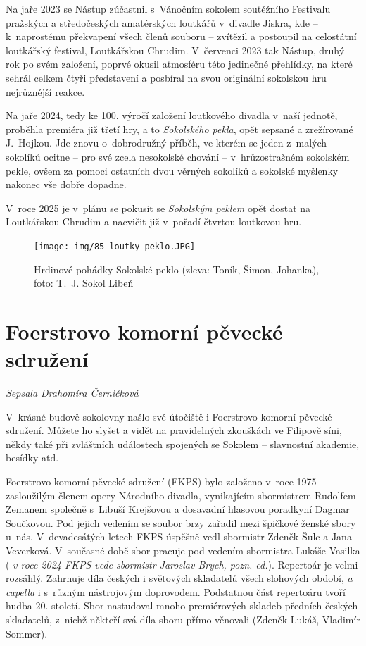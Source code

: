\documentclass[a5paper, 11pt, twoside]{article}
\newcommand{\pozned}[1]{%
\textit{#1}}
\begin{document}
Na jaře 2023 se Nástup zúčastnil s~Vánočním sokolem soutěžního Festivalu
pražských a středočeských amatérských loutkářů v~divadle Jiskra, kde --
k~naprostému překvapení všech členů souboru -- zvítězil a postoupil na
celostátní loutkářský festival, Loutkářskou Chrudim. V~červenci 2023 tak
Nástup, druhý rok po svém založení, poprvé okusil atmosféru této
jedinečné přehlídky, na které sehrál celkem čtyři představení a posbíral
na svou originální sokolskou hru nejrůznější reakce.

Na jaře 2024, tedy ke 100. výročí založení loutkového divadla v~naší
jednotě, proběhla premiéra již třetí hry, a to \textit{Sokolského pekla},
opět sepsané a zrežírované J.~Hojkou. Jde znovu o~dobrodružný příběh, ve
kterém se jeden z~malých sokolíků ocitne -- pro své zcela nesokolské
chování -- v~hrůzostrašném sokolském pekle, ovšem za pomoci ostatních
dvou věrných sokolíků a sokolské myšlenky nakonec vše dobře dopadne.

V~roce 2025 je v~plánu se pokusit se \textit{Sokolským peklem} opět dostat
na Loutkářskou Chrudim a nacvičit již v~pořadí čtvrtou loutkovou hru.

\begin{figure}[h]
  \centering 
  \texttt{[image: img/85\_loutky\_peklo.JPG]}
  \caption*{Hrdinové pohádky Sokolské peklo (zleva: Toník, Šimon, Johanka),
  foto: T.~J. Sokol Libeň}
\end{figure}

\section{Foerstrovo komorní pěvecké
sdružení}

\begin{center}
  \textit{Sepsala Drahomíra Černičková}
\end{center}

\noindent
V~krásné budově sokolovny našlo své útočiště i Foerstrovo komorní
pěvecké sdružení. Můžete ho slyšet a vidět na pravidelných zkouškách ve
Filipově síni, někdy také při zvláštních událostech spojených se Sokolem
-- slavnostní akademie, besídky atd.

Foerstrovo komorní pěvecké sdružení (FKPS) bylo založeno v~roce 1975
zasloužilým členem opery Národního divadla, vynikajícím sbormistrem
Rudolfem Zemanem společně s~Libuší Krejšovou a dosavadní hlasovou
poradkyní Dagmar Součkovou. Pod jejich vedením se soubor brzy zařadil
mezi špičkové ženské sbory u~nás. V~devadesátých letech FKPS úspěšně
vedl sbormistr Zdeněk Šulc a Jana Veverková. V~současné době sbor
pracuje pod vedením sbormistra Lukáše Vasilka (\pozned{v roce 2024 FKPS
vede sbormistr Jaroslav Brych, pozn. ed.}). Repertoár je velmi rozsáhlý.
Zahrnuje díla českých i světových skladatelů všech slohových období,
\textit{a capella} i s~různým nástrojovým doprovodem. Podstatnou část
repertoáru tvoří hudba 20. století. Sbor nastudoval mnoho premiérových
skladeb předních českých skladatelů, z~nichž někteří svá díla sboru
přímo věnovali (Zdeněk Lukáš, Vladimír Sommer).
\end{document}
